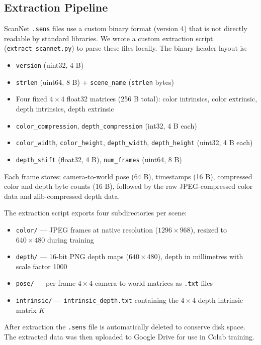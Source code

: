 \documentclass[10pt]{article}
\begin{document}
\subsection{Extraction Pipeline}

ScanNet \texttt{.sens} files use a custom binary format (version 4) that is not directly readable by standard libraries. We wrote a custom extraction script (\texttt{extract\_scannet.py}) to parse these files locally. The binary header layout is:

\begin{itemize}[leftmargin=*,itemsep=1pt]
    \item \texttt{version} (uint32, 4 B)
    \item \texttt{strlen} (uint64, 8 B) + \texttt{scene\_name} (\texttt{strlen} bytes)
    \item Four fixed $4{\times}4$ float32 matrices (256 B total): color intrinsics, color extrinsic, depth intrinsics, depth extrinsic
    \item \texttt{color\_compression}, \texttt{depth\_compression} (int32, 4 B each)
    \item \texttt{color\_width}, \texttt{color\_height}, \texttt{depth\_width}, \texttt{depth\_height} (uint32, 4 B each)
    \item \texttt{depth\_shift} (float32, 4 B), \texttt{num\_frames} (uint64, 8 B)
\end{itemize}

Each frame stores: camera-to-world pose (64 B), timestamps (16 B), compressed color and depth byte counts (16 B), followed by the raw JPEG-compressed color data and zlib-compressed depth data.

The extraction script exports four subdirectories per scene:
\begin{itemize}[leftmargin=*,itemsep=1pt]
    \item \texttt{color/} — JPEG frames at native resolution ($1296 \times 968$), resized to $640 \times 480$ during training
    \item \texttt{depth/} — 16-bit PNG depth maps ($640 \times 480$), depth in millimetres with scale factor 1000
    \item \texttt{pose/} — per-frame $4{\times}4$ camera-to-world matrices as \texttt{.txt} files
    \item \texttt{intrinsic/} — \texttt{intrinsic\_depth.txt} containing the $4{\times}4$ depth intrinsic matrix $K$
\end{itemize}

After extraction the \texttt{.sens} file is automatically deleted to conserve disk space. The extracted data was then uploaded to Google Drive for use in Colab training.
\end{document}
